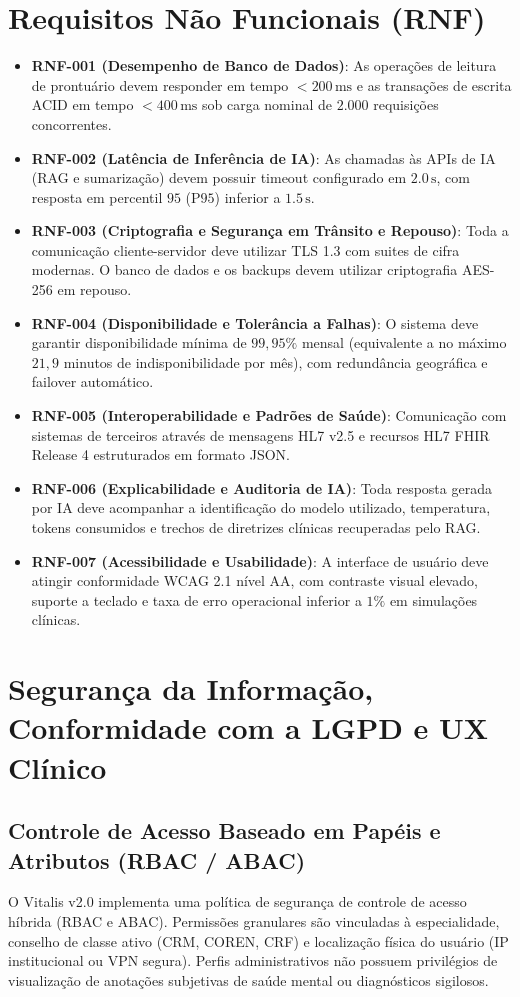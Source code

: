 \documentclass[12pt,oneside,a4paper,article]{abntex2}
\begin{document}
\section{Requisitos Não Funcionais (RNF)}
\begin{itemize}[noitemsep]
  \item \textbf{RNF-001 (Desempenho de Banco de Dados)}: As operações de leitura de prontuário devem responder em tempo $< 200\,\text{ms}$ e as transações de escrita ACID em tempo $< 400\,\text{ms}$ sob carga nominal de $2.000$ requisições concorrentes.
  \item \textbf{RNF-002 (Latência de Inferência de IA)}: As chamadas às APIs de IA (RAG e sumarização) devem possuir timeout configurado em $2.0\,\text{s}$, com resposta em percentil $95$ ($\text{P95}$) inferior a $1.5\,\text{s}$.
  \item \textbf{RNF-003 (Criptografia e Segurança em Trânsito e Repouso)}: Toda a comunicação cliente-servidor deve utilizar TLS 1.3 com suites de cifra modernas. O banco de dados e os backups devem utilizar criptografia AES-256 em repouso.
  \item \textbf{RNF-004 (Disponibilidade e Tolerância a Falhas)}: O sistema deve garantir disponibilidade mínima de $99,95\%$ mensal (equivalente a no máximo $21,9$ minutos de indisponibilidade por mês), com redundância geográfica e failover automático.
  \item \textbf{RNF-005 (Interoperabilidade e Padrões de Saúde)}: Comunicação com sistemas de terceiros através de mensagens HL7 v2.5 e recursos HL7 FHIR Release 4 estruturados em formato JSON.
  \item \textbf{RNF-006 (Explicabilidade e Auditoria de IA)}: Toda resposta gerada por IA deve acompanhar a identificação do modelo utilizado, temperatura, tokens consumidos e trechos de diretrizes clínicas recuperadas pelo RAG.
  \item \textbf{RNF-007 (Acessibilidade e Usabilidade)}: A interface de usuário deve atingir conformidade WCAG 2.1 nível AA, com contraste visual elevado, suporte a teclado e taxa de erro operacional inferior a $1\%$ em simulações clínicas.
\end{itemize}
\section{Segurança da Informação, Conformidade com a LGPD e UX Clínico}
\subsection{Controle de Acesso Baseado em Papéis e Atributos (RBAC / ABAC)}
O Vitalis v2.0 implementa uma política de segurança de controle de acesso híbrida (RBAC e ABAC). Permissões granulares são vinculadas à especialidade, conselho de classe ativo (CRM, COREN, CRF) e localização física do usuário (IP institucional ou VPN segura). Perfis administrativos não possuem privilégios de visualização de anotações subjetivas de saúde mental ou diagnósticos sigilosos.
\end{document}
